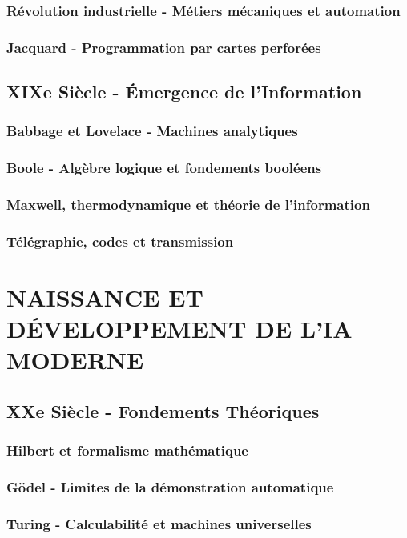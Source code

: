 \documentclass[12pt,a4paper]{book}
\begin{document}
\section{Révolution industrielle - Métiers mécaniques et automation}
\section{Jacquard - Programmation par cartes perforées}


\chapter{XIXe Siècle - Émergence de l'Information}
\section{Babbage et Lovelace - Machines analytiques}
\section{Boole - Algèbre logique et fondements booléens}
\section{Maxwell, thermodynamique et théorie de l'information}
\section{Télégraphie, codes et transmission}

\part{NAISSANCE ET DÉVELOPPEMENT DE L'IA MODERNE}
\chapter{XXe Siècle - Fondements Théoriques}
\section{Hilbert et formalisme mathématique}
\section{Gödel - Limites de la démonstration automatique}
\section{Turing - Calculabilité et machines universelles}
\end{document}
